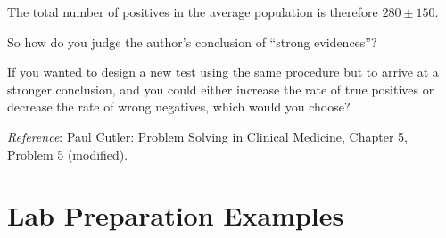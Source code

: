 The total number of positives in the average population is therefore $280 \pm 150$.\myskip

So how do you judge the author's conclusion of ``strong evidences''?\myskip

If you wanted to design a new test using the same procedure but to arrive at a stronger conclusion, and you could either increase the rate of true positives or decrease the rate of wrong negatives, which would you choose?\myskip

\noindent\emph{Reference}: Paul Cutler: Problem Solving in Clinical Medicine, Chapter 5, Problem 5 (modified).

\section{Lab Preparation Examples}

